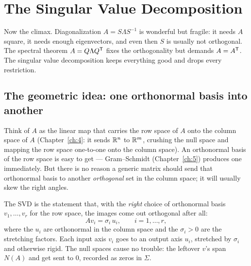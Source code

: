 \section{The Singular Value Decomposition}

Now the climax. Diagonalization $A=S\Lambda S^{-1}$ is wonderful but fragile: it needs $A$ square, it needs enough eigenvectors, and even then $S$ is usually not orthogonal. The spectral theorem $A=Q\Lambda Q^{\mathsf T}$ fixes the orthogonality but demands $A=A^{\mathsf T}$. The singular value decomposition keeps everything good and drops every restriction.


\subsection{The geometric idea: one orthonormal basis into another}

Think of $A$ as the linear map that carries the row space of $A$ onto the column space of $A$ (Chapter~\ref{ch:4}: it sends $\mathbb{R}^n$ to $\mathbb{R}^m$, crushing the null space and mapping the row space one-to-one onto the column space). An orthonormal basis of the row space is easy to get --- Gram--Schmidt (Chapter~\ref{ch:5}) produces one immediately. But there is no reason a generic matrix should send that orthonormal basis to another \emph{orthogonal} set in the column space; it will usually skew the right angles.

The SVD is the statement that, with the \emph{right} choice of orthonormal basis $v_1,\dots,v_r$ for the row space, the images come out orthogonal after all:
\[
   A v_i = \sigma_i\, u_i,
   \qquad i=1,\dots,r,
\]
where the $u_i$ are orthonormal in the column space and the $\sigma_i>0$ are the stretching factors. Each input axis $v_i$ goes to an output axis $u_i$, stretched by $\sigma_i$ and otherwise rigid. The null spaces cause no trouble: the leftover $v$'s span $N(A)$ and get sent to $0$, recorded as zeros in $\Sigma$.


